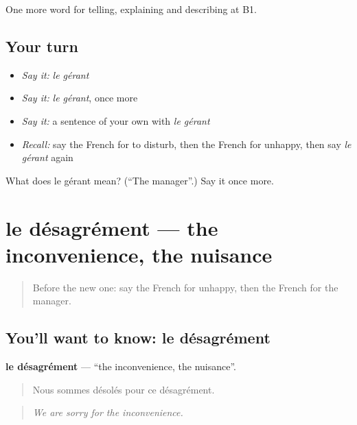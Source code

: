\begin{grammarlens}[title={What you've built}]
One more word for telling, explaining and describing at B1.
\end{grammarlens}

\subsection*{Your turn}
\begin{itemize}
\raggedright
  \item \emph{Say it:} \emph{le gérant}
  \item \emph{Say it:} \emph{le gérant}, once more
  \item \emph{Say it:} a sentence of your own with \emph{le gérant}
  \item \emph{Recall:} say the French for to disturb, then the French for unhappy, then say \emph{le gérant} again
\end{itemize}

\begin{tcolorbox}[breakable,colback=teal!4,colframe=teal!35!black,title={Before you move on}]
What does le gérant mean? (\textquotedblleft{}The manager\textquotedblright{}.) Say it once more.
\end{tcolorbox}
\section[le désagrément]{le désagrément — the inconvenience, the nuisance}

\label{lesson:FR-C432-desagrement}



\begin{quote}
Before the new one: say the French for unhappy, then the French for the manager.
\end{quote}

\subsection*{You'll want to know: le désagrément}
\textbf{le désagrément} — \textquotedblleft{}the inconvenience, the nuisance\textquotedblright{}.

\begin{quote}
Nous sommes désolés pour ce désagrément.
\end{quote}

\begin{quote}
\emph{We are sorry for the inconvenience.}
\end{quote}


